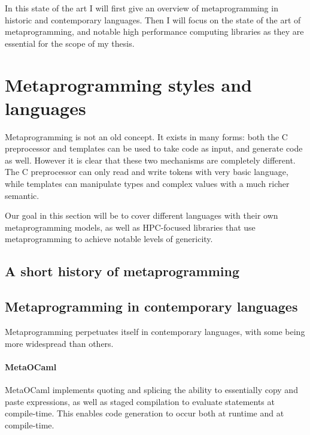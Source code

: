 \documentclass[../main]{subfiles}
\begin{document}

In this state of the art I will first give an overview of metaprogramming in
historic and contemporary languages. Then I will focus on the state of the art
of \cpp metaprogramming, and notable high performance computing libraries as they
are essential for the scope of my thesis.

\section{
  Metaprogramming styles and languages
}

Metaprogramming is not an old concept. It exists in many forms:
both the C preprocessor and \cpp templates can be used to take code as input,
and generate code as well.
However it is clear that these two mechanisms are completely different.
The C preprocessor can only read and write tokens with very basic language,
while \cpp templates can manipulate types and complex \cpp values
with a much richer semantic.

Our goal in this section will be to cover different languages with their own
metaprogramming models, as well as HPC-focused libraries that use
metaprogramming to achieve notable levels of genericity.

\subsection{A short history of metaprogramming}


\subsection{Metaprogramming in contemporary languages}

Metaprogramming perpetuates itself in contemporary languages,
with some being more widespread than others.

\paragraph{MetaOCaml}

MetaOCaml\cite{metaocaml} implements quoting and splicing
\ie the ability to essentially copy and paste expressions,
as well as staged compilation to evaluate statements at compile-time.
This enables code generation to occur both at runtime and at compile-time.
\end{document}
